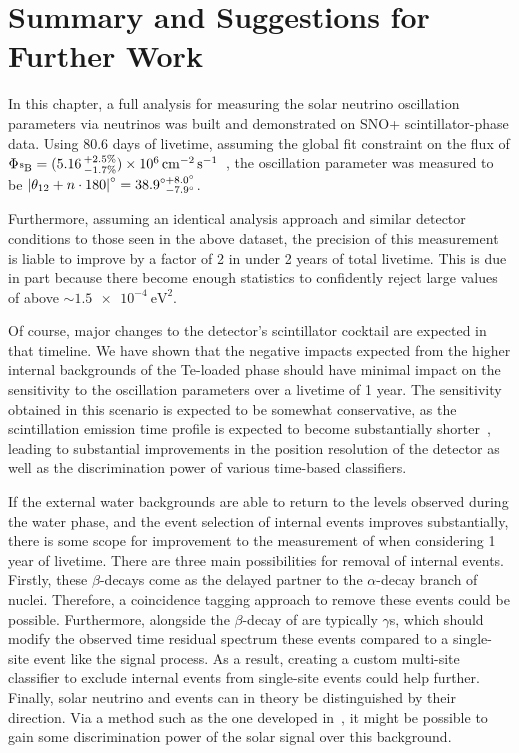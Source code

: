 \section{Summary and Suggestions for Further Work}
In this chapter, a full analysis for measuring the solar neutrino oscillation parameters via \beight{} neutrinos was built and demonstrated on SNO+ scintillator-phase data. Using 80.6 days of livetime, assuming the global fit constraint on the \beight{} flux of $\Phi_{\beight{}} = (5.16\,^{+2.5\%}_{-1.7\%})\times 10^{6}\,\si{\per\cm\squared\per\second}$~\cite{bergstromUpdatedDeterminationSolar2016}, %
the oscillation parameter \tonetwo{} was measured to be $\left|\theta_{12}{} + n\cdot180\right|^{\circ} = 38.9^{\circ+8.0^{\circ}}_{\phantom{\circ}-7.9^{\circ}}$.

Furthermore, assuming an identical analysis approach and similar detector conditions to those seen in the above dataset, the precision of this measurement is liable to improve by a factor of 2 in under 2 years of total livetime. This is due in part because there become enough statistics to confidently reject large values of \dmsq{} above $\sim\SI{1.5e-4}{\eV\squared}$.

Of course, major changes to the detector's scintillator cocktail are expected in that timeline. We have shown that the negative impacts expected from the higher internal backgrounds of the Te-loaded phase should have minimal impact on the sensitivity to the oscillation parameters over a livetime of 1 year. The sensitivity obtained in this scenario is expected to be somewhat conservative, as the scintillation emission time profile is expected to become substantially shorter~\cite{autyMethodLoadTellurium2023}, %
leading to substantial improvements in the position resolution of the detector as well as the discrimination power of various time-based classifiers.

If the external water backgrounds are able to return to the levels observed during the water phase, and the event selection of internal  events improves substantially, there is some scope for improvement to the measurement of \tonetwo{} when considering 1 year of livetime. There are three main possibilities for removal of internal  events. Firstly, these $\beta$-decays come as the delayed partner to the $\alpha$-decay branch of  nuclei. Therefore, a coincidence tagging approach to remove these events could be possible. Furthermore, alongside the $\beta$-decay of  are typically $\gamma$s, which should modify the observed time residual spectrum these events compared to a single-site event like the signal process. As a result, creating a custom multi-site classifier to exclude internal  events from single-site events could help further. Finally, solar neutrino and  events can in theory be distinguished by their direction. Via a method such as the one developed in~\cite{patonFirstObservationDirectionality}, %
it might be possible to gain some discrimination power of the solar signal over this background.

